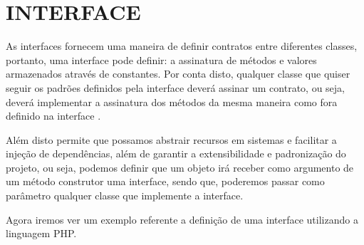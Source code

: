 \section{INTERFACE}

As interfaces fornecem uma maneira de definir contratos entre diferentes 
classes, portanto, uma interface pode definir: a assinatura de métodos e 
valores armazenados através de constantes. Por conta disto, qualquer classe  que
quiser seguir os padrões definidos pela interface deverá assinar um contrato, 
ou seja, deverá implementar a assinatura dos métodos da mesma maneira como  fora
definido na interface \cite{programmingPhp}.

Além disto permite que possamos abstrair recursos em sistemas e facilitar a 
injeção de dependências, além de garantir a extensibilidade e padronização do 
projeto, ou seja, podemos definir que um objeto irá receber como argumento de 
um método construtor uma interface, sendo que, poderemos passar como parâmetro 
qualquer classe que implemente a interface.

Agora iremos ver um exemplo referente a definição de uma interface utilizando  a
linguagem PHP.
